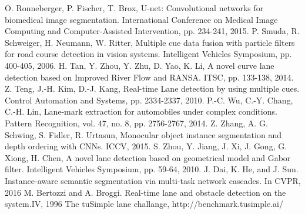 \documentclass[letterpaper, 10 pt, conference]{ieeeconf}
\begin{document}
\begin{thebibliography}{99}
 O. Ronneberger, P. Fischer, T. Brox, U-net: Convolutional networks for biomedical image segmentation. International Conference on Medical Image Computing and Computer-Assisted Intervention, pp. 234-241, 2015.
 P. Smuda, R. Schweiger, H. Neumann, W. Ritter, Multiple cue data fusion with particle filters for road course detection in vision systems. Intelligent Vehicles Symposium, pp. 400-405, 2006.
 H. Tan, Y. Zhou, Y. Zhu, D. Yao, K. Li, A novel curve lane detection based on Improved River Flow and RANSA. ITSC, pp. 133-138, 2014.
 Z. Teng, J.-H. Kim, D.-J. Kang, Real-time Lane detection by using multiple cues. Control Automation and Systems, pp. 2334-2337, 2010.
 P.-C. Wu, C.-Y. Chang, C.-H. Lin, Lane-mark extraction for automobiles under complex conditions. Pattern Recognition, vol. 47, no. 8, pp. 2756-2767, 2014.
 Z. Zhang, A. G. Schwing, S. Fidler, R. Urtasun, Monocular  object  instance  segmentation  and  depth  ordering  with
CNNs. ICCV, 2015.
 S. Zhou, Y. Jiang, J. Xi, J. Gong, G. Xiong, H. Chen, A novel lane detection based on geometrical model and Gabor filter. Intelligent Vehicles Symposium, pp. 59-64, 2010.
 J. Dai, K. He, and J. Sun.  Instance-aware semantic segmentation via multi-task network cascades. In CVPR, 2016
 M. Bertozzi and A. Broggi. Real-time lane and obstacle detection on the system.IV, 1996
 The tuSimple lane challange, http://benchmark.tusimple.ai/

\end{thebibliography}
\end{document}
